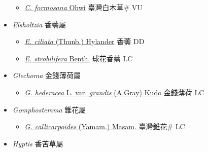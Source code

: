 \begin{itemize}
  \begin{itemize}
        \item[] \href{http://www.theplantlist.org/tpl1.1/search?q=Comanthosphace+formosana}{\textit{C. formosana} Ohwi}   臺灣白木草\# VU
  \end{itemize}
 \item[] \textit{Elsholtzia} 香薷屬
                    
  \begin{itemize}
        \item[] \href{http://www.theplantlist.org/tpl1.1/search?q=Elsholtzia+ciliata}{\textit{E. ciliata} (Thunb.) Hylander}   香薷 DD
        \item[] \href{http://www.theplantlist.org/tpl1.1/search?q=Elsholtzia+strobilifera}{\textit{E. strobilifera} Benth.}   球花香薷 LC
  \end{itemize}
 \item[] \textit{Glechoma} 金錢薄荷屬
                    
  \begin{itemize}
        \item[] \href{http://www.theplantlist.org/tpl1.1/search?q=Glechoma+hederacea+var.+grandis}{\textit{G. hederacea} L. var. \textit{grandis} (A.Gray) Kudo}   金錢薄荷 LC
  \end{itemize}
 \item[] \textit{Gomphostemma} 錐花屬
                    
  \begin{itemize}
        \item[] \href{http://www.theplantlist.org/tpl1.1/search?q=Gomphostemma+callicarpoides}{\textit{G. callicarpoides} (Yamam.) Masam.}   臺灣錐花\# LC
  \end{itemize}
 \item[] \textit{Hyptis} 香苦草屬
                    

\end{itemize}
